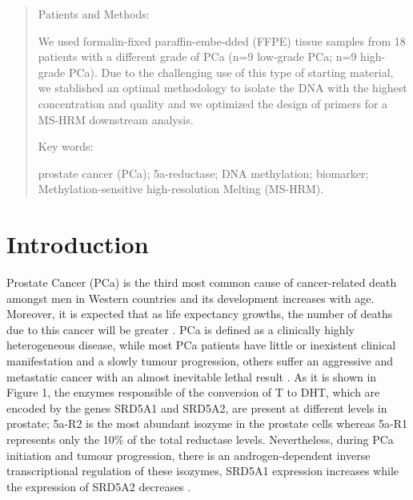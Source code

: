 \documentclass[a4paper,11pt]{article}
\begin{document}
\begin{abstract}
		\begin{bf} Patients and Methods: \end{bf} We used formalin-fixed paraffin-embe-dded (FFPE) tissue samples from 18 patients with a different grade of PCa (n=9 low-grade PCa; n=9 high-grade PCa). Due to the challenging use of this type of starting material, we stablished an optimal methodology to isolate the DNA with the highest concentration and quality and we optimized the design of primers for a MS-HRM downstream analysis. \\
		\begin{bf}Key words: \end{bf}prostate cancer (PCa); 5a-reductase; DNA methylation; biomarker; Methylation-sensitive high-resolution Melting (MS-HRM).\end{abstract}
	
			
\section{Introduction}
Prostate Cancer (PCa) is the third most common cause of cancer-related death amongst men in Western countries and its development increases with age. Moreover, it is expected that as life expectancy growths, the number of deaths due to this cancer will be greater \cite{Bashir2015, Thompson2013}. PCa is defined as a clinically highly heterogeneous disease, while most PCa patients have little or inexistent clinical manifestation and a slowly tumour progression, others suffer an aggressive and metastatic cancer with an almost inevitable lethal result \cite{Albertsen2005}. As it is shown in Figure 1, the enzymes responsible of the conversion of T to DHT, which are encoded by the genes SRD5A1 and SRD5A2, are present at different levels in prostate; 5a-R2 is the most abundant isozyme in the prostate cells whereas 5a-R1 represents only the 10\% of the total reductase levels. Nevertheless, during PCa initiation and tumour progression, there is an androgen-dependent inverse transcriptional regulation of these isozymes, SRD5A1 expression increases while the expression of SRD5A2 decreases \cite{Steers2001}.  \\ \\
\end{document}
